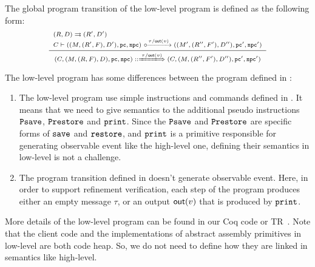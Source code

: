The global program transition of the low-level \sparc{} program is defined 
as the following form:
\[
    \scriptsize
    \infer
    {
        \LGlobTrans{(\code, (\Mem, (\RFile, \Wstack), \DBuf), \pc, \npc)}
            { \empmsg / \outEvt{\val} }
            {(\code, (\Mem, (\RFile'', \Wstack'), \DBuf''), \pc', \npc')}
    }
    {
        \begin{array}{l}
            \Dstep{(\RFile, \DBuf)}{(\RFile', \DBuf')} \\
            \llocalstep{\code}
                {((\Mem, (\RFile', \Wstack), \DBuf'), \pc, \npc)}
                { \empmsg / \outEvt{\val} }
                {((\Mem', (\RFile'', \Wstack'), \DBuf''), \pc', \npc')}
        \end{array}
    }
\]
{\color{blue}
The low-level \sparc{} program has 
some differences between the \sparc{} program defined in 
\Sec{\ref{sec:modeling}}: 
\begin{enumerate}
    \item The low-level \sparc{} program use simple 
        instructions and commands defined in 
        \Fig{\ref{fig:syntax-of-concur-pseudo-sparc}}. 
        It means that we need to give semantics to the additional 
        pseudo instructions $\texttt{Psave}$, $\texttt{Prestore}$ and 
        $\texttt{print}$. Since the $\texttt{Psave}$ and $\texttt{Prestore}$ 
        are specific forms of $\texttt{save}{}$ and 
        $\texttt{restore}{}$, and $\texttt{print}$ is a primitive 
        responsible for generating observable event
        like the high-level one, defining their 
        semantics in low-level is not a challenge.
    \item The program transition defined in 
        \Sec{\ref{sec:modeling}} doesn't generate 
        observable event. Here, in order to support 
        refinement verification, each step of the 
        program produces either an empty message $\tau$, 
        or an output $\textsf{out}({v})$ that is produced 
        by $\texttt{print}$. 
\end{enumerate}
}
More details of the low-level program can be found in 
our Coq code or TR~\cite{coqimp}. 
{\color{blue} Note that the client 
code and the implementations of abstract assembly primitives 
in low-level are both \sparc{} code heap. So, we do not need 
to define how they are linked in semantics like high-level.} 

% 

